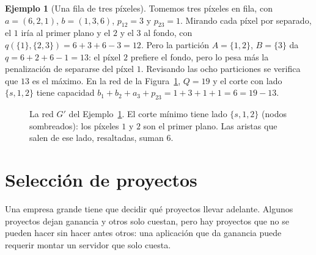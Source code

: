 \documentclass[12pt, spanish, oneside, openany]{book}
\theoremstyle{uprightplain}
\theoremstyle{definition}
\newtheorem{ejemplo}[teorema]{Ejemplo}
\theoremstyle{remark}
\theoremstyle{definition}
\begin{document}
\begin{ejemplo}[Una fila de tres píxeles]
\label{ej:flujo-segmentacion}
Tomemos tres píxeles en fila, con $a=(6,2,1)$, $b=(1,3,6)$, $p_{12}=3$ y $p_{23}=1$. Mirando cada píxel por separado, el $1$ iría al primer plano y el $2$ y el $3$ al fondo, con $q(\{1\},\{2,3\})=6+3+6-3=12$. Pero la partición $A=\{1,2\}$, $B=\{3\}$ da $q=6+2+6-1=13$: el píxel $2$ prefiere el fondo, pero lo pesa más la penalización de separarse del píxel $1$. Revisando las ocho particiones se verifica que $13$ es el máximo. En la red de la Figura~\ref{fig:flujo-segmentacion}, $Q=19$ y el corte con lado $\{s,1,2\}$ tiene capacidad $b_1+b_2+a_3+p_{23}=1+3+1+1=6=19-13$.
\end{ejemplo}

\begin{figure}[H]
\centering
{}
\caption{La red $G'$ del Ejemplo~\ref{ej:flujo-segmentacion}. El corte mínimo
tiene lado $\{s,1,2\}$ (nodos sombreados): los píxeles $1$ y $2$ son el primer
plano. Las aristas que salen de ese lado, resaltadas, suman $6$.}
\label{fig:flujo-segmentacion}
\end{figure}


\section{Selección de proyectos}
\label{sec:flujo-proyectos}

Una empresa grande tiene que decidir qué proyectos llevar adelante. Algunos proyectos dejan ganancia y otros solo cuestan, pero hay proyectos que no se pueden hacer sin hacer antes otros: una aplicación que da ganancia puede requerir montar un servidor que solo cuesta.
\end{document}
